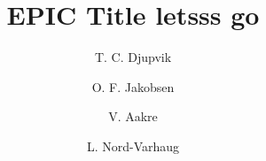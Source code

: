 
\title{EPIC Title letsss go}
\author[1]{T. C. Djupvik}
\author[1]{O. F. Jakobsen}
\author[1]{V. Aakre}
\author[1]{L. Nord-Varhaug}


\maketitle
